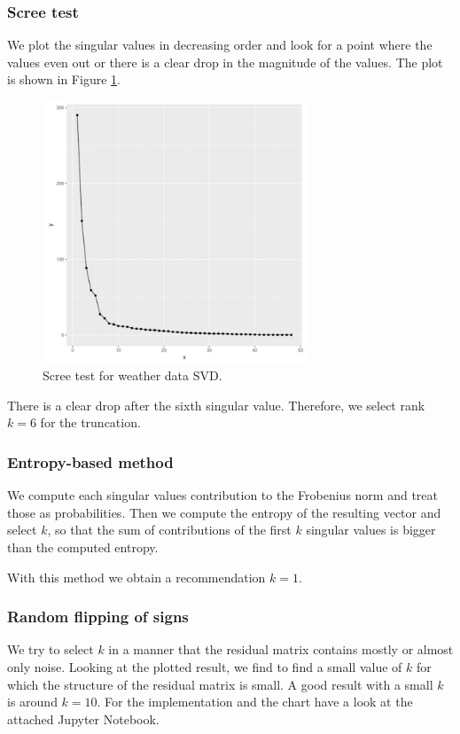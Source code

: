 \documentclass{support/acm_proc_article-sp}
\begin{document}
    \subsubsection{Scree test}

    We plot the singular values in decreasing order and look for a point where the values even out or there is a
    clear drop in the magnitude of the values.
    The plot is shown in Figure \ref{fig:2e-scree}.
    \begin{figure}[!htbp]
        \centering
        \includegraphics[width=8cm]{images/2e-scree.png}
        \caption{Scree test for weather data SVD.}
        \label{fig:2e-scree}
    \end{figure}

    There is a clear drop after the sixth singular value.
    Therefore, we select rank $k=6$ for the truncation.

    \subsubsection{Entropy-based method}

    We compute each singular values contribution to the Frobenius norm and treat those as probabilities.
    Then we compute the entropy of the resulting vector and select $k$, so that the sum of contributions of the
    first $k$ singular values is bigger than the computed entropy.

    With this method we obtain a recommendation $k=1$.

    \subsubsection{Random flipping of signs}

    We try to select $k$ in a manner that the residual matrix contains mostly or almost only noise.
    Looking at the plotted result, we find to find a small value of $k$ for which the structure of the residual
    matrix is small.
    A good result with a small $k$ is around $k=10$.
    For the implementation and the chart have a look at the attached Jupyter Notebook.
\end{document}
